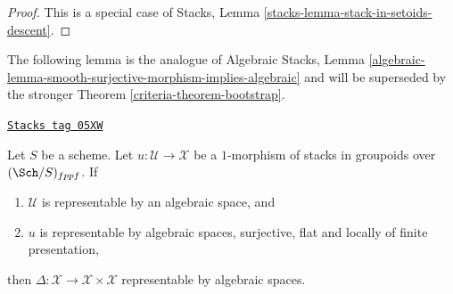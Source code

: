 \begin{proof}
This is a special case of
Stacks, Lemma \ref{stacks-lemma-stack-in-setoids-descent}.
\end{proof}

The following lemma is the analogue of
Algebraic Stacks, Lemma
\ref{algebraic-lemma-smooth-surjective-morphism-implies-algebraic}
and will be superseded by the stronger
Theorem \ref{criteria-theorem-bootstrap}.

\begin{lemma}
\label{criteria-lemma-flat-finite-presentation-surjective-diagonal}
\href{https://stacks.math.columbia.edu/tag/05XW}{\texttt{Stacks tag 05XW}}

Let $S$ be a scheme.
Let $u : \mathcal{U} \to \mathcal{X}$ be a $1$-morphism of
stacks in groupoids over $(\Sch/S)_{fppf}$. If
\begin{enumerate}
\item $\mathcal{U}$ is representable by an algebraic space, and
\item $u$ is representable by algebraic spaces, surjective, flat and
locally of finite presentation,
\end{enumerate}
then
$\Delta : \mathcal{X} \to \mathcal{X} \times \mathcal{X}$
representable by algebraic spaces.
\end{lemma}


